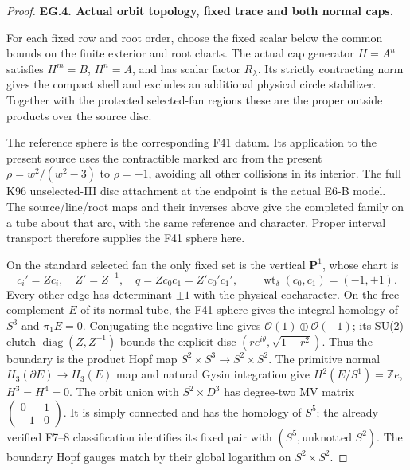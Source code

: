 \begin{proof}
\par\medskip\noindent\textbf{EG.4. Actual orbit topology, fixed trace and both normal caps.}\par\nopagebreak[4]

For each fixed row and root order, choose the fixed
scalar below the common bounds on the finite exterior
and root charts. The actual cap generator \(H=A^n\)
satisfies \(H^m=B\), \(H^n=A\), and has scalar factor
\(R_\lambda\). Its strictly contracting norm gives
the compact shell and excludes an additional physical
circle stabilizer. Together with the protected
selected-fan regions these are the proper outside
products over the source disc.

The reference sphere is the corresponding F41 datum.
Its application to the present source uses the
contractible marked arc from the present
\(\rho=w^2/(w^2-3)\) to \(\rho=-1\), avoiding all
other collisions in its interior. The full K96
unselected-III disc attachment at the endpoint is
the actual E6-B model. The source/line/root maps
and their inverses above give the completed
family on a tube about that arc, with the same
reference and character. Proper interval
transport therefore supplies the F41 sphere here.

On the standard selected fan the only fixed set
is the vertical \(\mathbf P^1\), whose chart is
\[
 c_i'=Zc_i,\quad Z'=Z^{-1},\quad
 q=Zc_0c_1=Z'c_0'c_1',\qquad
 \operatorname{wt}_\delta(c_0,c_1)=(-1,+1).
 \tag{EG.34}
\]
Every other edge has determinant \(\pm1\) with
the physical cocharacter. On the free complement
\(E\) of its normal tube, the F41 sphere gives
the integral homology of \(S^3\) and \(\pi_1E=0\).
Conjugating the negative line gives
\(\mathcal O(1)\oplus\mathcal O(-1)\); its SU(2)
clutch \(\operatorname{diag}(Z,Z^{-1})\) bounds
the explicit disc \((r e^{i\theta},\sqrt{1-r^2})\).
Thus the boundary is the product Hopf map
\(S^2\times S^3\to S^2\times S^2\).
The primitive normal \(H_3(\partial E)\to H_3(E)\)
map and natural Gysin integration give
\(H^2(E/S^1)=\mathbb Z e\), \(H^3=H^4=0\).
The orbit union with \(S^2\times D^3\) has
degree-two MV matrix \(\left(\begin{smallmatrix}0&1\\-1&0\end{smallmatrix}\right)\).
It is simply connected and has the homology
of \(S^5\); the already verified F7--8
classification identifies its fixed pair with
\((S^5,\text{unknotted }S^2)\). The boundary
Hopf gauges match by their global logarithm
on \(S^2\times S^2\).


\end{proof}
